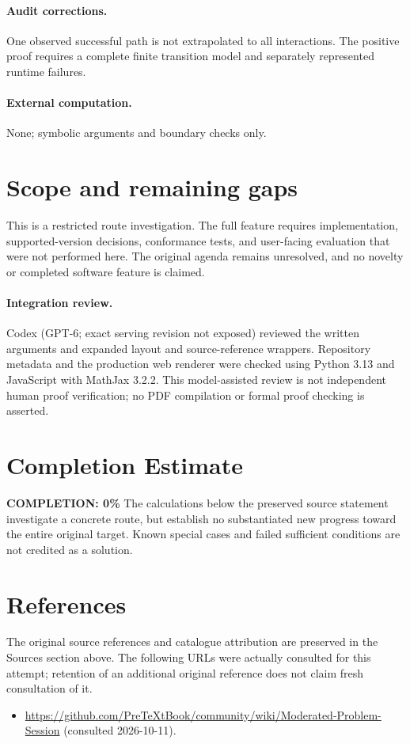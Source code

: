 \documentclass[11pt]{article}
\begin{document}
\paragraph{Audit corrections.} One observed successful path is not extrapolated to all interactions. The positive proof requires a complete finite transition model and separately represented runtime failures.
\paragraph{External computation.} None; symbolic arguments and boundary checks only.
\section{Scope and remaining gaps}
This is a restricted route investigation. The full feature requires implementation, supported-version decisions, conformance tests, and user-facing evaluation that were not performed here. The original agenda remains unresolved, and no novelty or completed software feature is claimed.
\paragraph{Integration review.} Codex (GPT-6; exact serving revision not exposed) reviewed the written arguments and expanded layout and source-reference wrappers. Repository metadata and the production web renderer were checked using Python 3.13 and JavaScript with MathJax 3.2.2. This model-assisted review is not independent human proof verification; no PDF compilation or formal proof checking is asserted.

\section{Completion Estimate}
\noindent\textbf{COMPLETION: 0\%}
The calculations below the preserved source statement investigate a concrete route,
but establish no substantiated new progress toward the entire original target.
Known special cases and failed sufficient conditions are not credited as a solution.
\section{References}
The original source references and catalogue attribution are preserved in the
Sources section above. The following URLs were actually consulted for this attempt;
retention of an additional original reference does not claim fresh consultation of it.
\begin{itemize}
\item \url{https://github.com/PreTeXtBook/community/wiki/Moderated-Problem-Session} (consulted 2026-10-11). 
\end{itemize}
\end{document}
